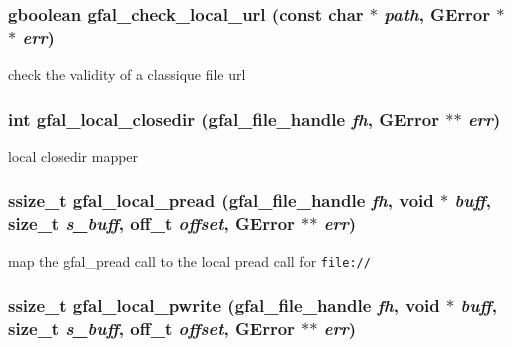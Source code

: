 \subsubsection{\setlength{\rightskip}{0pt plus 5cm}gboolean gfal\_\-check\_\-local\_\-url (const char $\ast$ {\em path}, GError $\ast$$\ast$ {\em err})}\label{gfal__posix__local__file_8c_02987ce8beeb908c36ee3d4ef3bc5618}


check the validity of a classique file url 
\subsubsection{\setlength{\rightskip}{0pt plus 5cm}int gfal\_\-local\_\-closedir (gfal\_\-file\_\-handle {\em fh}, GError $\ast$$\ast$ {\em err})}\label{gfal__posix__local__file_8c_483fdd49a5459dc85237e75fd03280bf}


local closedir mapper 
\subsubsection{\setlength{\rightskip}{0pt plus 5cm}ssize\_\-t gfal\_\-local\_\-pread (gfal\_\-file\_\-handle {\em fh}, void $\ast$ {\em buff}, size\_\-t {\em s\_\-buff}, off\_\-t {\em offset}, GError $\ast$$\ast$ {\em err})}\label{gfal__posix__local__file_8c_a125db353a6fad3952a991fd416068b9}


map the gfal\_\-pread call to the local pread call for \tt{file://} 
\subsubsection{\setlength{\rightskip}{0pt plus 5cm}ssize\_\-t gfal\_\-local\_\-pwrite (gfal\_\-file\_\-handle {\em fh}, void $\ast$ {\em buff}, size\_\-t {\em s\_\-buff}, off\_\-t {\em offset}, GError $\ast$$\ast$ {\em err})}\label{gfal__posix__local__file_8c_8e2ea01514707426a55d24e0e99a048c}


